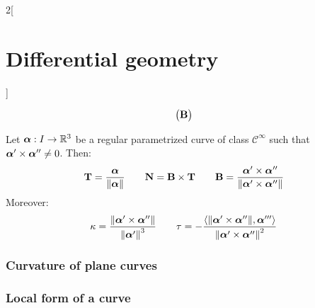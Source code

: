 \documentclass[../../../main.tex]{subfiles}
\begin{document}
\begin{multicols}{2}[\section{Differential geometry}]
\begin{theorem}
$$\begin{pmatrix}
        \boldsymbol{\mathrm{B}} \\
      \end{pmatrix}
    $$
  \end{theorem}
  \begin{corollary}
    Let $\boldsymbol{\mathrm{\alpha}}:I\rightarrow\mathbb{R}^3$ be a regular parametrized curve of class $\mathcal{C}^\infty$ such that $\boldsymbol{\mathrm{\alpha}}'\times \boldsymbol{\mathrm{\alpha}}''\ne 0$. Then:
    $$\boldsymbol{\mathrm{T}}=\frac{\boldsymbol{\mathrm{\alpha}}}{\|\boldsymbol{\mathrm{\alpha}}\|}\qquad\boldsymbol{\mathrm{N}}=\boldsymbol{\mathrm{B}}\times\boldsymbol{\mathrm{T}}\qquad\boldsymbol{\mathrm{B}}=\frac{\boldsymbol{\mathrm{\alpha}}'\times\boldsymbol{\mathrm{\alpha}}''}{\|\boldsymbol{\mathrm{\alpha}}'\times\boldsymbol{\mathrm{\alpha}}''\|}$$
    Moreover: $$\kappa=\frac{\|\boldsymbol{\mathrm{\alpha}}'\times\boldsymbol{\mathrm{\alpha}}''\|}{{\|\boldsymbol{\mathrm{\alpha}}'\|}^3}\qquad\tau=-\frac{\langle\|\boldsymbol{\mathrm{\alpha}}'\times\boldsymbol{\mathrm{\alpha}}''\|,\boldsymbol{\mathrm{\alpha}}'''\rangle}{{\|\boldsymbol{\mathrm{\alpha}}'\times\boldsymbol{\mathrm{\alpha}}''\|}^2}$$
  \end{corollary}
  \subsubsection{Curvature of plane curves}
  \subsubsection{Local form of a curve}
\end{multicols}
\end{document}
